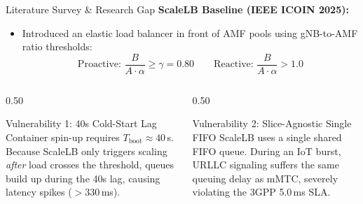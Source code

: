 \documentclass[aspectratio=169,10pt]{beamer}
\begin{document}
\begin{frame}{Literature Survey \& Research Gap}
    \textbf{ScaleLB Baseline (IEEE ICOIN 2025):}
    \begin{itemize}
        \item Introduced an elastic load balancer in front of AMF pools using gNB-to-AMF ratio thresholds:
        $$\text{Proactive: } \frac{B}{A \cdot \alpha} \ge \gamma = 0.80 \qquad \text{Reactive: } \frac{B}{A \cdot \alpha} > 1.0$$
    \end{itemize}

    \vspace{0.2cm}
    \begin{columns}[T]
        \begin{column}{0.50\textwidth}
            \begin{alertblock}{Vulnerability 1: 40s Cold-Start Lag}
                Container spin-up requires $T_{\text{boot}} \approx 40$\,s. Because ScaleLB only triggers scaling \textit{after} load crosses the threshold, queues build up during the 40s lag, causing latency spikes ($>330$\,ms).
            \end{alertblock}
        \end{column}
        \begin{column}{0.50\textwidth}
            \begin{alertblock}{Vulnerability 2: Slice-Agnostic Single FIFO}
                ScaleLB uses a single shared FIFO queue. During an IoT burst, URLLC signaling suffers the same queuing delay as mMTC, severely violating the 3GPP 5.0\,ms SLA.
            \end{alertblock}
        \end{column}
    \end{columns}
\end{frame}
\end{document}
